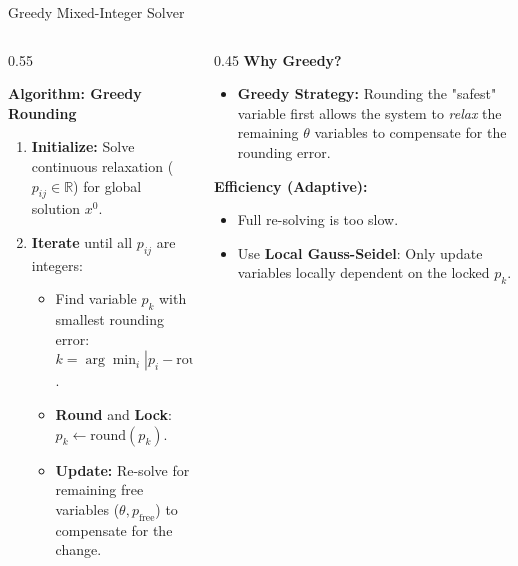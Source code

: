 \documentclass[aspectratio=169]{beamer}
\begin{document}
\begin{frame}{Greedy Mixed-Integer Solver}

\begin{columns}
\begin{column}{0.55\textwidth}
\begin{algorithm}[H]
\footnotesize
\textbf{Algorithm: Greedy Rounding}
\begin{enumerate}
    \item \textbf{Initialize:} Solve continuous relaxation ($p_{ij} \in \mathbb{R}$) for global solution $x^0$.
    \item \textbf{Iterate} until all $p_{ij}$ are integers:
    \begin{itemize}
        \item Find variable $p_k$ with smallest rounding error:  $k = \arg \min_i | p_i - \text{round}(p_i) |$.
        \item \textbf{Round} and \textbf{Lock}:  $p_k \leftarrow \text{round}(p_k)$.
        \item \textbf{Update:} Re-solve for remaining free variables ($\theta, p_{\text{free}}$) to compensate for the change.
    \end{itemize}
\end{enumerate}
\end{algorithm}
\end{column}

\begin{column}{0.45\textwidth}
\small
\textbf{Why Greedy?}
\begin{itemize}
    \item \textbf{Greedy Strategy:} Rounding the "safest" variable first allows the system to \emph{relax} the remaining $\theta$ variables to compensate for the rounding error.
\end{itemize}

\vspace{0.2cm}
\textbf{Efficiency (Adaptive):}
\begin{itemize}
    \item Full re-solving is too slow.
    \item Use \textbf{Local Gauss-Seidel}: Only update variables locally dependent on the locked $p_k$.
\end{itemize}
\end{column}
\end{columns}
\end{frame}
\end{document}
